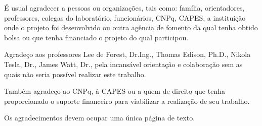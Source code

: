 \noindent 
É usual agradecer a pessoas ou organizações, tais como: família, orientadores, professores, colegas do laboratório, funcionários, CNPq, CAPES, a instituição onde o projeto foi desenvolvido ou outra agência de fomento da qual tenha obtido bolsa ou que tenha financiado o projeto do qual participou.

\noindent%
Agradeço aos professores Lee de Forest, Dr.Ing., Thomas Edison,
Ph.D., Nikola Tesla, Dr., James Watt, Dr., pela incansável orientação e colaboração sem as quais não seria possível realizar este trabalho.

\noindent%
Também agradeço ao CNPq, à CAPES ou a quem de direito que tenha proporcionado o suporte financeiro para viabilizar a realização de seu trabalho.

\noindent%
Os agradecimentos devem ocupar uma única página de texto.
\vfill